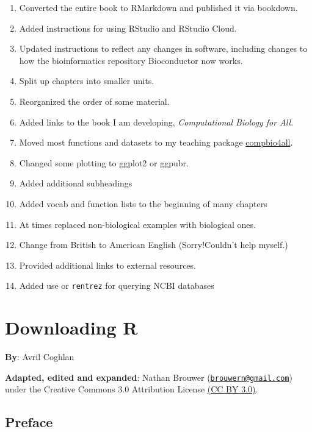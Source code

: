 \documentclass[
]{book}
\providecommand{\tightlist}{%
  \setlength{\itemsep}{0pt}\setlength{\parskip}{0pt}}
\begin{document}
\begin{enumerate}
\def\labelenumi{\arabic{enumi}.}
\tightlist
\item
  Converted the entire book to RMarkdown and published it via bookdown.
\item
  Added instructions for using RStudio and RStudio Cloud.
\item
  Updated instructions to reflect any changes in software, including changes to how the bioinformatics repository Bioconductor now works.
\item
  Split up chapters into smaller units.
\item
  Reorganized the order of some material.
\item
  Added links to the book I am developing, \emph{Computational Biology for All}.
\item
  Moved most functions and datasets to my teaching package \href{https://github.com/brouwern/compbio4all}{compbio4all}.
\item
  Changed some plotting to ggplot2 or ggpubr.
\item
  Added additional subheadings
\item
  Added vocab and function lists to the beginning of many chapters
\item
  At times replaced non-biological examples with biological ones.
\item
  Change from British to American English (Sorry!Couldn't help myself.)
\item
  Provided additional links to external resources.
\item
  Added use or \texttt{rentrez} for querying NCBI databases
\end{enumerate}

\hypertarget{downloading-r}{%
\chapter{Downloading R}\label{downloading-r}}

\textbf{By}: Avril Coghlan

\textbf{Adapted, edited and expanded}: Nathan Brouwer (\href{mailto:brouwern@gmail.com}{\nolinkurl{brouwern@gmail.com}}) under the Creative Commons 3.0 Attribution License \href{https://creativecommons.org/licenses/by/3.0/}{(CC BY 3.0)}.

\hypertarget{preface}{%
\section{Preface}\label{preface}}
\end{document}
